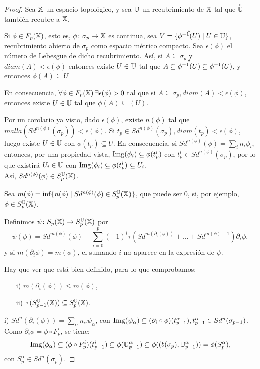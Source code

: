 \begin{proof}
  Sea ${\mathbb X}$ un espacio topológico, y sea ${\mathbb U}$ un recubrimiento de ${\mathbb X}$ tal que $\interior{\U}$ también recubre a ${\mathbb X}$.

  Si $\phi \in F_p({\mathbb X})$, esto es, $\phi \colon \sigma_p \to {\mathbb X}$ es continua, sea $V = \{\interior{\phi^{-1}(U)} \mid U \in \U\}$, recubrimiento
  abierto de $\sigma_p$ como espacio métrico compacto. Sea $\epsilon(\phi)$ el número de Lebesgue de dicho recubrimiento.
  Así, si $A \subseteq \sigma_p$ y $diam(A) < \epsilon(\phi)$ entonces existe $U \in {\mathbb U}$ tal que $A \subseteq \interior{\phi^{-1}(U)} \subseteq
  \phi^{-1}(U)$, y entonces $\phi(A) \subseteq U$

  En consecuencia, $\forall \phi \in F_p({\mathbb X}) \hspace{0.2em} \exists \epsilon(\phi) > 0$ tal que si $A \subseteq \sigma_p, diam(A) < \epsilon(\phi)$,
  entonces existe $U \in {\mathbb U}$ tal que $\phi(A) \subseteq(U)$.

  Por un corolario ya visto, dado $\epsilon(\phi)$, existe $n(\phi)$ tal que ${malla(Sd^{n(\phi)}(\sigma_p)) < \epsilon(\phi)}$.
  Si $t_p \in Sd^{n(\phi)}(\sigma_p), diam(t_p) < \epsilon(\phi)$, luego existe $U \in {\mathbb U}$ con $\phi(t_p) \subseteq U$.
  En consecuencia, si $Sd^{n(\phi)}(\phi) = \sum_i n_i \phi_i$,  entonces, por una propiedad vista, $\operatorname{Img}(\phi_i) \subseteq \phi(t_p^i)$
  con $t_p^i \in Sd^{n(\phi)}(\sigma_p)$, por lo que existirá $U_i \in {\mathbb U}$ con $\operatorname{Img}(\phi_i) \subseteq \phi(t_p^i) \subseteq U_i$. \\
  Así, $Sd^{n(\phi)}(\phi) \in S_p^{\mathbb U}({\mathbb X})$.

  Sea $m(\phi) = \inf\{n(\phi) \mid Sd^{n(\phi)}(\phi) \in S_p^{\mathbb U}({\mathbb X})\}$, que puede ser $0$, si, por ejemplo, $\phi \in S_p^{\mathbb U}({\mathbb X})$.

  Definimos $\psi \colon S_p({\mathbb X}) \to S_p^{\mathbb U}({\mathbb X})$ por
  \[\psi(\phi) = Sd^{m(\phi)}(\phi) - \sum\limits_{i = 0}^p (-1)^i \tau(Sd^{m(\partial_i(\phi))} + \dots + Sd^{m(\phi) - 1}) \partial_i \phi, \]
  y si $m(\partial_i \phi) = m (\phi)$, el sumando $i$ no aparece en la expresión de $\psi$.

  Hay que ver que está bien definido, para lo que comprobamos:
  \begin{itemize}
    \item[i)] $m(\partial_i(\phi)) \leq m(\phi)$,
    \item[ii)] $\tau(S_{p-1}^{\mathbb U}({\mathbb X})) \subseteq S_p^{\mathbb U}({\mathbb X})$.
  \end{itemize}

  i) $Sd^n(\partial_i(\phi)) = \sum_\alpha n_\alpha \psi_\alpha$, con $\operatorname{Img}(\psi_\alpha) \subseteq (\partial_i \circ \phi)(t_{p-1}^\alpha), t_{p-1}^\alpha \in Sd^n(\sigma_{p-1})$. \\
  Como $\partial_i \phi = \phi \circ F_p^i$, se tiene:
  \[ \operatorname{Img}(\phi_\alpha) \subseteq (\phi \circ F_p^i)(t_{p-1}^i) \subseteq \phi({\mathbb U}_{p-1}^\alpha) \subseteq \phi((b(\sigma_p), {\mathbb U}_ {p-1}^\alpha)) = \phi(S_p^\alpha),\]
  con $S_p^\alpha \in Sd^n(\sigma_p)$.


\end{proof}
